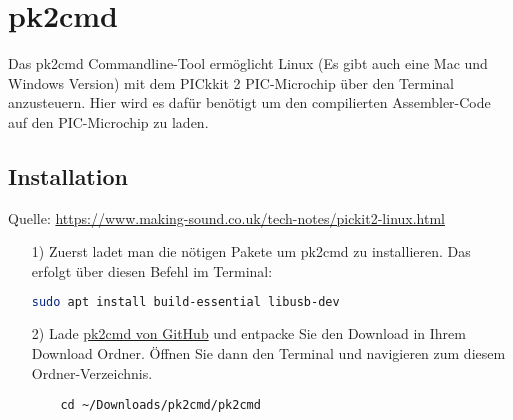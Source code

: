 \section{pk2cmd}
\label{sec:pk2cmd}
Das pk2cmd Commandline-Tool ermöglicht Linux (Es gibt auch eine Mac und Windows Version) mit dem PICkkit 2 PIC-Microchip über den Terminal anzusteuern. Hier wird es dafür benötigt um den compilierten Assembler-Code auf den PIC-Microchip zu laden.

\subsection{Installation}
\label{sub:installation}
Quelle: \url{https://www.making-sound.co.uk/tech-notes/pickit2-linux.html}\\

\begin{itemize}
    \item[1)] Zuerst ladet man die nötigen Pakete um pk2cmd zu installieren. Das erfolgt über diesen Befehl im Terminal:
    \begin{lstlisting}[language=bash]
    sudo apt install build-essential libusb-dev
    \end{lstlisting}
    \item[2)] Lade \href{https://github.com/psmay/pk2cmd}{pk2cmd von GitHub} und entpacke Sie den Download in Ihrem Download Ordner. Öffnen Sie dann den Terminal und navigieren zum diesem Ordner-Verzeichnis.
    \begin{lstlisting}
    cd ~/Downloads/pk2cmd/pk2cmd
    \end{lstlisting}
    

\end{itemize}
